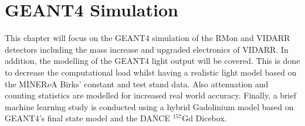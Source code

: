 

\chapter{GEANT4 Simulation}\label{chp:GEANT4Simulation}
\ifpdf
    \graphicspath{{Chapter4/Figs/Raster/}{Chapter4/Figs/PDF/}{Chapter4/Figs/}}
\else
    \graphicspath{{Chapter4/Figs/Vector/}{Chapter4/Figs/}}
\fi

This chapter will focus on the GEANT4 simulation of the RMon and VIDARR detectors including the mass increase and upgraded electronics of VIDARR. In addition, the modelling of the GEANT4 light output will be covered. This is done to decrease the computational load whilst having a realistic light model based on the MINER$\nu$A Birks' constant and test stand data. Also attenuation and counting statistics are modelled for increased real world accuracy. Finally, a brief machine learning study is conducted using a hybrid Gadolinium model based on GEANT4's final state model and the DANCE $^{157}$Gd Dicebox.

